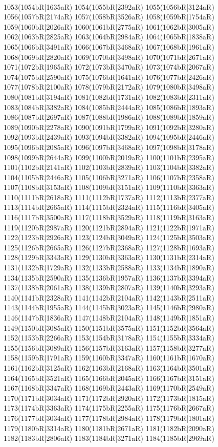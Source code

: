\\1053(1054bR|1635aR) 1054(1055bR|2392aR) 1055(1056bR|3124aR) 1056(1057bR|2174aR) 1057(1058bR|3526aR) 1058(1059bR|1754aR) 1059(1060bR|2026aR) 1060(1061bR|2775aR) 1061(1062bR|3005aR) \\1062(1063bR|2825aR) 1063(1064bR|2984aR) 1064(1065bR|1838aR) 1065(1066bR|3491aR) 1066(1067bR|3468aR) 1067(1068bR|1961aR) 1068(1069bR|2820aR) 1069(1070bR|3498aR) 1070(1071bR|2671aR) \\1071(1072bR|1965aR) 1072(1073bR|3470aR) 1073(1074bR|2067aR) 1074(1075bR|2590aR) 1075(1076bR|1641aR) 1076(1077bR|2426aR) 1077(1078bR|2100aR) 1078(1079bR|2172aR) 1079(1080bR|3498aR) \\1080(1081bR|3194aR) 1081(1082bR|1731aR) 1082(1083bR|2311aR) 1083(1084bR|3382aR) 1084(1085bR|2444aR) 1085(1086bR|1893aR) 1086(1087bR|2697aR) 1087(1088bR|1986aR) 1088(1089bR|1859aR) \\1089(1090bR|2278aR) 1090(1091bR|1799aR) 1091(1092bR|3280aR) 1092(1093bR|2439aR) 1093(1094bR|3382aR) 1094(1095bR|2446aR) 1095(1096bR|2085aR) 1096(1097bR|3468aR) 1097(1098bR|3178aR) \\1098(1099bR|2644aR) 1099(1100bR|2019aR) 1100(1101bR|2395aR) 1101(1102bR|2141aR) 1102(1103bR|2839aR) 1103(1104bR|3382aR) 1104(1105bR|2446aR) 1105(1106bR|3271aR) 1106(1107bR|2358aR) \\1107(1108bR|3153aR) 1108(1109bR|3151aR) 1109(1110bR|3363aR) 1110(1111bR|2618aR) 1111(1112bR|1737aR) 1112(1113bR|2377aR) 1113(1114bR|2665aR) 1114(1115bR|2324aR) 1115(1116bR|3405aR) \\1116(1117bR|3500aR) 1117(1118bR|3529aR) 1118(1119bR|3163aR) 1119(1120bR|2987aR) 1120(1121bR|2894aR) 1121(1122bR|1971aR) 1122(1123bR|2926aR) 1123(1124bR|3049aR) 1124(1125bR|3503aR) \\1125(1126bR|2665aR) 1126(1127bR|2368aR) 1127(1128bR|1693aR) 1128(1129bR|3343aR) 1129(1130bR|3363aR) 1130(1131bR|2314aR) 1131(1132bR|1729aR) 1132(1133bR|2588aR) 1133(1134bR|1890aR) \\1134(1135bR|2590aR) 1135(1136bR|1957aR) 1136(1137bR|3394aR) 1137(1138bR|2061aR) 1138(1139bR|2807aR) 1139(1140bR|3293aR) 1140(1141bR|2328aR) 1141(1142bR|2104aR) 1142(1143bR|2511aR) \\1143(1144bR|1955aR) 1144(1145bR|3023aR) 1145(1146bR|2980aR) 1146(1147bR|1836aR) 1147(1148bR|2104aR) 1148(1149bR|1851aR) 1149(1150bR|3085aR) 1150(1151bR|3575aR) 1151(1152bR|3564aR) \\1152(1153bR|2266aR) 1153(1154bR|3178aR) 1154(1155bR|3334aR) 1155(1156bR|3089aR) 1156(1157bR|3163aR) 1157(1158bR|3277aR) 1158(1159bR|1791aR) 1159(1160bR|3347aR) 1160(1161bR|1670aR) \\1161(1162bR|3125aR) 1162(1163bR|2168aR) 1163(1164bR|3501aR) 1164(1165bR|3521aR) 1165(1166bR|2045aR) 1166(1167bR|3151aR) 1167(1168bR|3347aR) 1168(1169bR|2443aR) 1169(1170bR|2549aR) \\1170(1171bR|3034aR) 1171(1172bR|2920aR) 1172(1173bR|1815aR) 1173(1174bR|3363aR) 1174(1175bR|2255aR) 1175(1176bR|2667aR) 1176(1177bR|3034aR) 1177(1178bR|2984aR) 1178(1179bR|1801aR) \\1179(1180bR|3314aR) 1180(1181bR|2671aR) 1181(1182bR|2090aR) 1182(1183bR|2806aR) 1183(1184bR|3271aR) 1184(1185bR|2969aR) 
